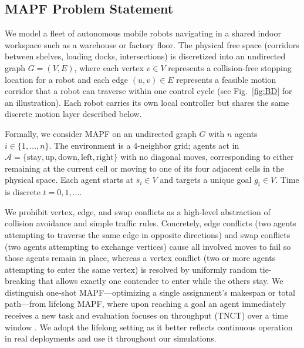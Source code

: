 \documentclass[conference]{IEEEtran}
\begin{document}
\subsection{MAPF Problem Statement}
\label{MAPF Problem Statement}
We model a fleet of autonomous mobile robots navigating in a shared indoor workspace such as a warehouse or factory floor. The physical free space (corridors between shelves, loading docks, intersections) is discretized into an undirected graph $G=(V,E)$, where each vertex $v\in V$ represents a collision-free stopping location for a robot and each edge $(u,v)\in E$ represents a feasible motion corridor that a robot can traverse within one control cycle (see Fig.~\ref{fig:BD} for an illustration). Each robot carries its own local controller but shares the same discrete motion layer described below.

Formally, we consider MAPF on an undirected graph $G$ with $n$ agents $i\in\{1,\dots,n\}$. The environment is a 4-neighbor grid; agents act in $\mathcal{A}=\{\text{stay},\text{up},\text{down},\text{left},\text{right}\}$ with no diagonal moves, corresponding to either remaining at the current cell or moving to one of its four adjacent cells in the physical space. Each agent starts at $s_i\in V$ and targets a unique goal $g_i\in V$. Time is discrete $t=0,1,\dots$.

We prohibit vertex, edge, and swap conflicts \cite{sharon2015conflict} as a high-level abstraction of collision avoidance and simple traffic rules. Concretely, edge conflicts (two agents attempting to traverse the same edge in opposite directions) and swap conflicts (two agents attempting to exchange vertices) cause all involved moves to fail so those agents remain in place, whereas a vertex conflict (two or more agents attempting to enter the same vertex) is resolved by uniformly random tie-breaking that allows exactly one contender to enter while the others stay. We distinguish one-shot MAPF—optimizing a single assignment’s makespan or total path—from lifelong MAPF, where upon reaching a goal an agent immediately receives a new task and evaluation focuses on throughput (TNCT) over a time window \cite{sartoretti2019primal,li2021lifelong}. We adopt the lifelong setting as it better reflects continuous operation in real deployments and use it throughout our simulations.
\end{document}
